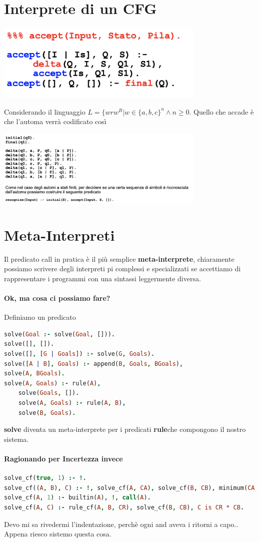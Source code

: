 \documentclass[12pt, a4paper, openany, oneside]{book}
\begin{document}
\section{Interprete di un CFG}
\begin{center}
\includegraphics[width=0.75\textwidth]{acceptpila}
\end{center}
Considerando il linguaggio $L=\{wrw^{R}|w \in\{a,b,c\}^{n} \wedge n\geq0$.
Quello che accade è che l'automa verrà codificato così
\begin{center}
\includegraphics[width=0.75\textwidth]{codificaauto}
\end{center}
\section{Meta-Interpreti}
Il predicato call in pratica è il più semplice \textbf{meta-interprete},
chiaramente possiamo scrivere degli interpreti pi complessi e specializzati
se accettiamo di rappresentare i programmi con una sintassi leggermente 
diversa.
\paragraph{Ok, ma cosa ci possiamo fare? }Definiamo un predicato 
\begin{lstlisting}[language=Prolog]
solve(Goal :- solve(Goal, [])).
solve([], []).
solve([], [G | Goals]) :- solve(G, Goals). 
solve([A | B], Goals) :- append(B, Goals, BGoals),
solve(A, BGoals). 
solve(A, Goals) :- rule(A),
	solve(Goals, []). 
	solve(A, Goals) :- rule(A, B), 
	solve(B, Goals).
\end{lstlisting}
\textbf{solve} diventa un meta-interprete per i predicati \textbf{rule}che
compongono il nostro sistema.
\paragraph{Ragionando per Incertezza invece}
\begin{lstlisting}[language=Prolog]
solve_cf(true, 1) :- !.
solve_cf((A, B), C) :- !, solve_cf(A, CA), solve_cf(B, CB), minimum(CA, CB, C).
solve_cf(A, 1) :- builtin(A), !, call(A).
solve_cf(A, C) :- rule_cf(A, B, CR), solve_cf(B, CB), C is CR * CB.
\end{lstlisting}	
Devo mi sa rivedermi l'indentazione, perchè ogni and aveva i ritorni a capo.. 
Appena riesco sistemo questa cosa.
\end{document}
